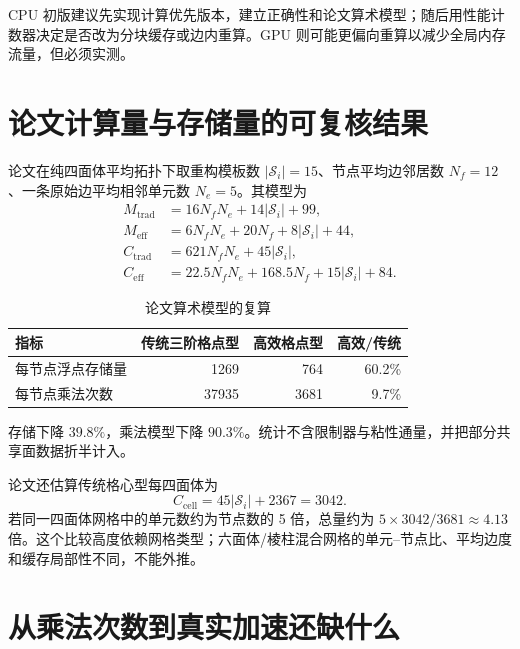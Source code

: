 \documentclass[UTF8,a4paper,11pt,openany]{ctexrep}
\numberwithin{equation}{chapter}
\begin{document}
CPU 初版建议先实现计算优先版本，建立正确性和论文算术模型；随后用性能计数器决定是否改为分块缓存或边内重算。GPU 则可能更偏向重算以减少全局内存流量，但必须实测。

\section{论文计算量与存储量的可复核结果}

论文在纯四面体平均拓扑下取重构模板数 $|\mathcal S_i|=15$、节点平均边邻居数 $N_f=12$、一条原始边平均相邻单元数 $N_e=5$。其模型为
\begin{align}
 M_{\mathrm{trad}}&=16N_fN_e+14|\mathcal S_i|+99,\\
 M_{\mathrm{eff}}&=6N_fN_e+20N_f+8|\mathcal S_i|+44,\\
 C_{\mathrm{trad}}&=621N_fN_e+45|\mathcal S_i|,\\
 C_{\mathrm{eff}}&=22.5N_fN_e+168.5N_f+15|\mathcal S_i|+84.
\end{align}

\begin{table}[htbp]
\centering
\caption{论文算术模型的复算}
\begin{threeparttable}
\begin{tabular}{lrrr}
\toprule
指标 & 传统三阶格点型 & 高效格点型 & 高效/传统\\
\midrule
每节点浮点存储量 & 1269 & 764 & 60.2\%\\
每节点乘法次数 & 37935 & 3681 & 9.7\%\\
\bottomrule
\end{tabular}
\begin{tablenotes}\small
\item 存储下降 $39.8\%$，乘法模型下降 $90.3\%$。统计不含限制器与粘性通量，并把部分共享面数据折半计入。
\end{tablenotes}
\end{threeparttable}
\end{table}

论文还估算传统格心型每四面体为
\begin{equation}
  C_{\mathrm{cell}}=45|\mathcal S_i|+2367=3042.
\end{equation}
若同一四面体网格中的单元数约为节点数的 5 倍，总量约为 $5\times3042/3681\approx4.13$ 倍。这个比较高度依赖网格类型；六面体/棱柱混合网格的单元--节点比、平均边度和缓存局部性不同，不能外推。

\section{从乘法次数到真实加速还缺什么}
\end{document}

